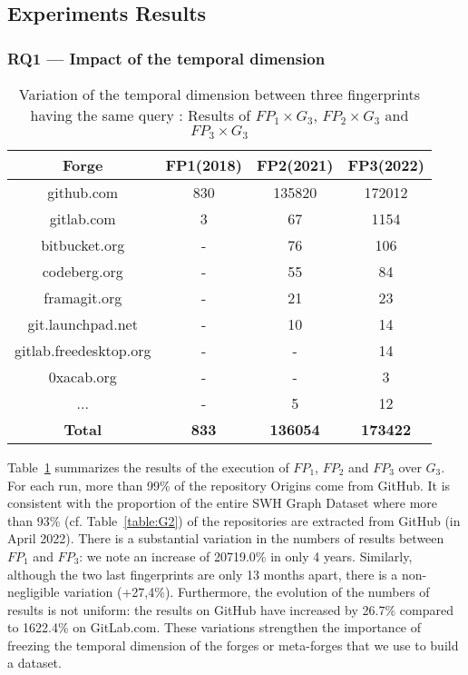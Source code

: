  \subsection{Experiments Results}

\subsubsection{\textbf{RQ1 — Impact of the temporal dimension}}
\vspace{-5 pt}
\begin{table}[ht]
\centering
\small
\caption{Variation of the temporal dimension between three fingerprints having the same query : Results of  $FP_1 \times G_3$, $FP_2 \times G_3$ and $FP_3 \times G_3$}
\vspace{-5 pt}

\begin{tabular}{ |c|c|c|c| }
\hline
 \textbf{Forge} &\textbf{FP1(2018)} & \textbf{FP2(2021)} & \textbf{FP3(2022)} \\
\hline
            github.com &    830 &  135820 & 172012 \\
            gitlab.com &      3 &      67 &   1154 \\
         bitbucket.org &      - &      76 &    106 \\
          codeberg.org &      - &      55 &     84 \\
          framagit.org &      - &      21 &     23 \\
     git.launchpad.net &      - &      10 &     14 \\
gitlab.freedesktop.org &      - &         - &     14 \\
            0xacab.org &      - &         - &      3 \\
       ...             &      - &         5 &      12 \\
       \hline
\textbf{Total} & \textbf{833} & \textbf{136054} & \textbf{173422} \\
 \hline
\end{tabular}
\label{table:G2xFP2_G2xFP1}
\end{table}

Table~\ref{table:G2xFP2_G2xFP1} summarizes the results of the execution of $FP_1$, $FP_2$ and $FP_3$ over $G_3$. 
For each run, more than 99\% of the repository Origins come from GitHub.
It is consistent with the proportion of the entire SWH Graph Dataset where more than 93\%  (cf. Table~\ref{table:G2}) of the repositories are extracted from GitHub (in April 2022). 
There is a substantial variation in the numbers of results between $FP_1$ and $FP_3$: we note an increase of 20719.0\% in only 4 years. 
Similarly, although the two last fingerprints are only 13 months apart, there is a non-negligible variation (+27,4\%). Furthermore, the evolution of the numbers of results is not uniform: the results on GitHub have increased by 26.7\% compared to 1622.4\% on GitLab.com.
These variations strengthen the importance of freezing the temporal dimension of the forges or meta-forges that we use to build a dataset. 
 
